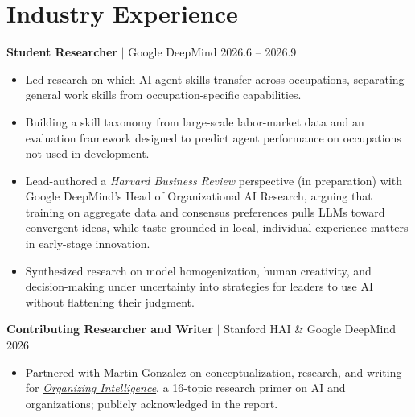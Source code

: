 \documentclass[11pt,letterpaper]{article}
\begin{document}
\section*{Industry Experience}

\noindent\begin{minipage}{\textwidth}
\noindent\textbf{Student Researcher} $|$ Google DeepMind \hfill 2026.6 -- 2026.9
\begin{itemize}
    \item Led research on which AI-agent skills transfer across occupations, separating general work skills from occupation-specific capabilities.
    \item Building a skill taxonomy from large-scale labor-market data and an evaluation framework designed to predict agent performance on occupations not used in development.
    \item Lead-authored a \textit{Harvard Business Review} perspective (in preparation) with Google DeepMind's Head of Organizational AI Research, arguing that training on aggregate data and consensus preferences pulls LLMs toward convergent ideas, while taste grounded in local, individual experience matters in early-stage innovation.
    \item Synthesized research on model homogenization, human creativity, and decision-making under uncertainty into strategies for leaders to use AI without flattening their judgment.
\end{itemize}
\end{minipage}

\vspace{0.5em}
\noindent\begin{minipage}{\textwidth}
\noindent\textbf{Contributing Researcher and Writer} $|$ Stanford HAI \& Google DeepMind \hfill 2026
\begin{itemize}
    \item Partnered with Martin Gonzalez on conceptualization, research, and writing for \href{https://storage.googleapis.com/deepmind-media/research/organizing-intelligence/organizing-intelligence-research-primer.pdf}{\textit{Organizing Intelligence}}, a 16-topic research primer on AI and organizations; publicly acknowledged in the report.
\end{itemize}
\end{minipage}
\end{document}
